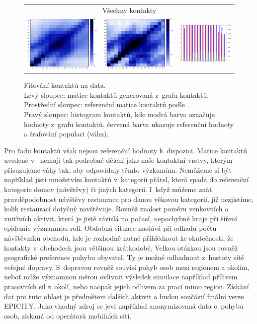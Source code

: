 \begin{figure}
\begin{center}
\begin{tabular}{|ccc|}
      \hline
      \multicolumn{3}{|c|}{Všechny kontakty} \\        
      \includegraphics[width=38mm]{pic/all_mat.eps} &
      \includegraphics[width=38mm]{pic/all_mat_ref.eps} &
      \includegraphics[width=28mm]{pic/all.eps}\\
      \hline

\end{tabular}
\end{center}
\caption{Fitování kontaktů na data.  \\ Levý sloupec: matice kontaktů generovaná z~grafu kontaktů. \\ Prostřední sloupec: referenční matice kontaktů podle \cite{Prem_etal2017}. \\ Pravý sloupec: histogram kontaktů, kde modrá barva označuje hodnoty z~grafu kontaktů, červená barva ukazuje referenční hodnoty a šrafování populaci (váhu).}
\label{maticekontaktu}
\end{figure}

Pro řadu kontaktů však nejsou referenční hodnoty k~dispozici. Matice kontaktů uvedené v~\cite{Prem_etal2017} nemají tak podrobné dělení jako naše kontaktní vrstvy, kterým přisuzujeme váhy tak, aby odpovídaly těmto výzkumům. Nemůžeme si být například jisti množstvím kontaktů v~kategorii přátel, která spadá do referenční kategorie domov (návštěvy) či jiných kategorií. I~když můžeme znát pravděpodobnost návštěvy restaurace pro danou věkovou kategorii, již nezjistíme, kolik restaurací dotyčný navštěvuje. Rovněž znalost poměru venkovních a vnitřních aktivit, která je jistě závislá na počasí, nepochybně hraje při šíření epidemie vý\-znam\-nou roli. Obdobná situace nastává při odhadu počtu návštěvníků obchodů, kde je rozhodně nutné přihlédnout ke skutečnosti, že kontakty v~obchodech jsou většinou krátkodobé.
Velkou otázkou jsou rovněž geografické preference pohybu obyvatel. Ty je možné odhadnout z~hustoty sítě veřejné dopravy. S~dopravou rovněž souvisí pohyb osob mezi regionem a okolím, neboť může významnou měrou ovlivnit výsledek simulace například přílivem pracovních sil z~okolí, nebo naopak jejich odlivem za prací mimo region. Získání dat pro tuto oblast je předmětem dalších aktivit a budou součástí finální verze EPICITY. Jako vhodný zdroj se jeví například anonymizovaná data o~pohybu osob, získaná od operátorů mobilních sítí. 

